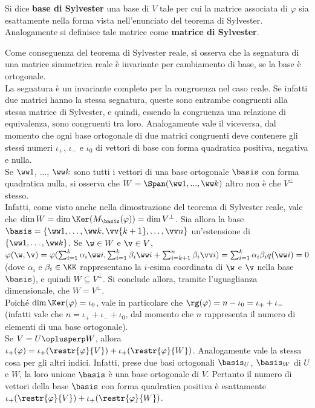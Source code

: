 \documentclass[11pt]{article}
\begin{document}
	\begin{definition}
		Si dice \textbf{base di Sylvester} una base di $V$ tale per cui la
		matrice associata di $\varphi$ sia esattamente nella forma
		vista nell'enunciato del teorema di Sylvester. Analogamente
		si definisce tale matrice come \textbf{matrice di Sylvester}.
	\end{definition}

	\begin{remark} \nl
		\li Come conseguenza del teorema di Sylvester reale, si osserva che la segnatura di una matrice simmetrica reale
		è invariante per cambiamento di base, se la base è ortogonale. \\

		\li La segnatura è un invariante completo per la congruenza nel caso reale. Se infatti due matrici hanno la stessa segnatura, queste sono
		entrambe congruenti alla stessa matrice di Sylvester, e quindi, essendo
		la congruenza una relazione di equivalenza, sono congruenti
		tra loro. Analogamente vale il viceversa, dal momento che ogni
		base ortogonale di due matrici congruenti deve contenere gli
		stessi numeri $\iota_+$, $\iota_-$ e $\iota_0$ di vettori
		di base con forma quadratica positiva, negativa e nulla. \\

		\li Se $\ww 1$, ..., $\ww k$ sono tutti i vettori di una base
		ortogonale $\basis$ con forma quadratica nulla, si osserva che $W = \Span(\ww 1, ..., \ww k)$ altro non è che $V^\perp$ stesso. \\
		
		Infatti, come
		visto anche nella dimostrazione del teorema di Sylvester reale, vale
		che	$\dim W = \dim \Ker (M_\basis(\varphi)) = \dim V^\perp$.
		Sia allora la base $\basis = \{\ww 1, \ldots, \ww k, \vv{k+1}, \ldots, \vv n\}$ un'estensione di $\{\ww 1, \ldots, \ww k\}$. Se $\w \in W$ e $\v \in V$, $\varphi(\w, \v) = \varphi(\sum_{i=1}^k
		\alpha_i \ww i, \sum_{i=1}^k \beta_i \ww i + \sum_{i=k+1}^n \beta_i \vv i)
		= \sum_{i=1}^k \alpha_i \beta_i q(\ww i) = 0$ (dove $\alpha_i$ e $\beta_i \in \KK$ rappresentano la $i$-esima coordinata di $\w$ e $\v$ nella base $\basis$), e quindi
		$W \subseteq V^\perp$. Si conclude allora, tramite l'uguaglianza
		dimensionale, che $W = V^\perp$. \\

		\li Poiché $\dim \Ker(\varphi) = \iota_0$, vale in particolare che $\rg(\varphi) = n - \iota_0 = \iota_+ + \iota_-$ (infatti vale che $n = \iota_+ + \iota_- + \iota_0$, dal momento che $n$ rappresenta il numero di elementi di una base ortogonale). \\

		\li Se $V = U \oplusperp W$, allora $\iota_+(\varphi) = \iota_+(\restr{\varphi}{V}) + \iota_+(\restr{\varphi}{W})$.
		Analogamente vale la stessa cosa per gli altri indici. Infatti,
		prese due basi ortogonali $\basis_U$, $\basis_W$ di $U$ e $W$,
		la loro unione $\basis$ è una base ortogonale di $V$. Pertanto
		il numero di vettori della base $\basis$ con forma quadratica positiva
		è esattamente $\iota_+(\restr{\varphi}{V}) + \iota_+(\restr{\varphi}{W})$.
	\end{remark}
\end{document}
